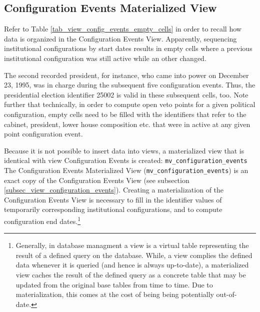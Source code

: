 \subsection{Configuration Events Materialized View}\label{subsec_mview_configuration_events}


Refer to Table \ref{tab_view_config_events_empty_cells} in order to recall how data is organized in the Configuration Events View.
Apparently, sequencing institutional configurations by start dates results in empty cells where a previous institutional configuration was still active while an other changed. 

The second recorded president, for instance, who came into power on December 23, 1995, was in charge during the subsequent five configuration events. 
Thus, the presidential election identifier 25002 is valid in these subsequent cells, too.
Note further that technically, in order to compute open veto points for a given political configuration, empty cells need to be filled with the identifiers that refer to the cabinet, president, lower house composition etc. that were in active at any given point configuration event.

Because it is not possible to insert data into views, a materialized view that is identical with view Configuration Events is created: \texttt{mv\_configuration\_events}
The Configuration Events Materialized View (\texttt{mv\_configuration\_events}) is an exact copy of the Configuration Events View (see subsection \ref{subsec_view_configuration_events}).
Creating a materialization of the Configuration Events View is necessary to fill in the identifier values of temporarily corresponding institutional configurations, and to compute configuration end dates.\footnote{%
Generally, in database managment a view is a virtual table representing the result of a defined query on the database.%
While, a view complies the defined data whenever it is queried (and hence is always up-to-date), a materialized view caches the result of the defined query as a concrete table that may be updated from the original base tables from time to time. 
Due to materialization, this comes at the cost of being being potentially out-of-date.}

